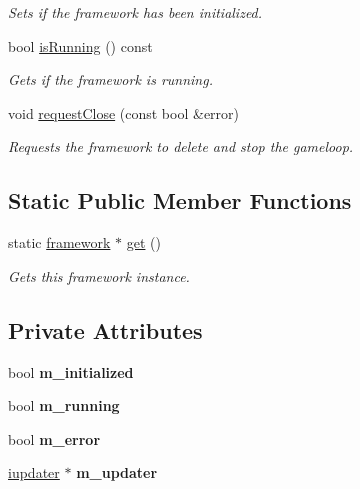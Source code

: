 \begin{DoxyCompactItemize}
\begin{DoxyCompactList}\small\item\em Sets if the framework has been initialized. \end{DoxyCompactList}\item 
bool \hyperlink{classflounder_1_1framework_a7e2584d7a3443c07b1d5eac2f44da14f}{is\+Running} () const
\begin{DoxyCompactList}\small\item\em Gets if the framework is running. \end{DoxyCompactList}\item 
void \hyperlink{classflounder_1_1framework_ad443bf70cbc62d372cf39939cd7c2e09}{request\+Close} (const bool \&error)
\begin{DoxyCompactList}\small\item\em Requests the framework to delete and stop the gameloop. \end{DoxyCompactList}\end{DoxyCompactItemize}
\subsection*{Static Public Member Functions}
\begin{DoxyCompactItemize}
\item 
static \hyperlink{classflounder_1_1framework}{framework} $\ast$ \hyperlink{classflounder_1_1framework_a1b1dbf1058cc4589b090326baf1beb87}{get} ()
\begin{DoxyCompactList}\small\item\em Gets this framework instance. \end{DoxyCompactList}\end{DoxyCompactItemize}
\subsection*{Private Attributes}
\begin{DoxyCompactItemize}
\item 
\mbox{\label{classflounder_1_1framework_aa8d5bd06f84d96cd899a2dc0a923f6c0}} 
bool {\bfseries m\+\_\+initialized}
\item 
\mbox{\label{classflounder_1_1framework_ae35bf0984c893efe82cdedfd0a5ff99c}} 
bool {\bfseries m\+\_\+running}
\item 
\mbox{\label{classflounder_1_1framework_a330204f666427dfaeb7b0e2557b678e9}} 
bool {\bfseries m\+\_\+error}
\item 
\mbox{\label{classflounder_1_1framework_a5b02f37837a680807cb9e84e7172a6a3}} 
\hyperlink{classflounder_1_1iupdater}{iupdater} $\ast$ {\bfseries m\+\_\+updater}
\end{DoxyCompactItemize}
